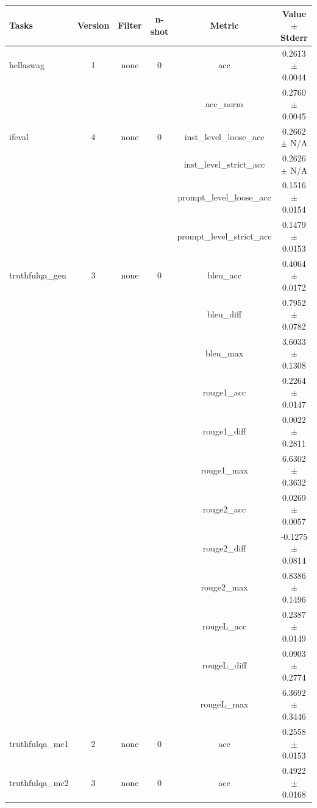 \documentclass{ifacconf}
\begin{document}
\begin{strip}
\begin{minipage}{\textwidth}
    \begin{table}[H]
    \centering
    \begin{tabular}{|l|c|c|c|c|c|}
    \hline
    \textbf{Tasks} & \textbf{Version} & \textbf{Filter} & \textbf{n-shot} & \textbf{Metric} & \textbf{Value} $\pm$ \textbf{Stderr} \\ \hline
    hellaswag & 1 & none & 0 & acc & 0.2613 $\pm$ 0.0044 \\ \hline
    & & & & acc\_norm & 0.2760 $\pm$ 0.0045 \\ \hline
    ifeval & 4 & none & 0 & inst\_level\_loose\_acc & 0.2662 $\pm$ N/A \\ \hline
    & & & & inst\_level\_strict\_acc & 0.2626 $\pm$ N/A \\ \hline
    & & & & prompt\_level\_loose\_acc & 0.1516 $\pm$ 0.0154 \\ \hline
    & & & & prompt\_level\_strict\_acc & 0.1479 $\pm$ 0.0153 \\ \hline
    truthfulqa\_gen & 3 & none & 0 & bleu\_acc & 0.4064 $\pm$ 0.0172 \\ \hline
    & & & & bleu\_diff & 0.7952 $\pm$ 0.0782 \\ \hline
    & & & & bleu\_max & 3.6033 $\pm$ 0.1308 \\ \hline
    & & & & rouge1\_acc & 0.2264 $\pm$ 0.0147 \\ \hline
    & & & & rouge1\_diff & 0.0022 $\pm$ 0.2811 \\ \hline
    & & & & rouge1\_max & 6.6302 $\pm$ 0.3632 \\ \hline
    & & & & rouge2\_acc & 0.0269 $\pm$ 0.0057 \\ \hline
    & & & & rouge2\_diff & -0.1275 $\pm$ 0.0814 \\ \hline
    & & & & rouge2\_max & 0.8386 $\pm$ 0.1496 \\ \hline
    & & & & rougeL\_acc & 0.2387 $\pm$ 0.0149 \\ \hline
    & & & & rougeL\_diff & 0.0903 $\pm$ 0.2774 \\ \hline
    & & & & rougeL\_max & 6.3692 $\pm$ 0.3446 \\ \hline
    truthfulqa\_mc1 & 2 & none & 0 & acc & 0.2558 $\pm$ 0.0153 \\ \hline
    truthfulqa\_mc2 & 3 & none & 0 & acc & 0.4922 $\pm$ 0.0168 \\ \hline
    \end{tabular}
    \label{tab:qwen25_q4km}
    \end{table}
\end{minipage}
\end{strip}
\end{document}
